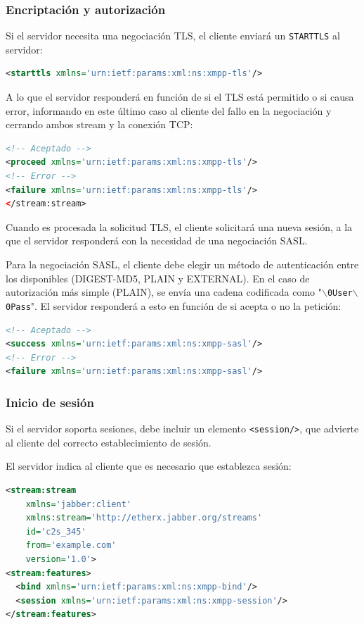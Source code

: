\documentclass[a4paper, 11pt]{article} %
\begin{document}
  \subsubsection{Encriptación y autorización}
    Si el servidor necesita una negociación TLS, el cliente enviará un \texttt{STARTTLS} al servidor:
    \begin{lstlisting}[language=XML]
<starttls xmlns='urn:ietf:params:xml:ns:xmpp-tls'/>    
    \end{lstlisting}
    A lo que el servidor responderá en función de si el TLS está permitido o si causa error, informando en
    este último caso al cliente del fallo en la negociación y cerrando ambos stream y la conexión TCP:
    \begin{lstlisting}[language=XML]
<!-- Aceptado -->
<proceed xmlns='urn:ietf:params:xml:ns:xmpp-tls'/> 
<!-- Error -->
<failure xmlns='urn:ietf:params:xml:ns:xmpp-tls'/> 
</stream:stream>
    \end{lstlisting}
    Cuando es procesada la solicitud TLS, el cliente solicitará una nueva sesión, a la que el servidor
    responderá con la necesidad de una negociación SASL.

    Para la negociación SASL, el cliente debe elegir un método de autenticación entre los disponibles
    (DIGEST-MD5, PLAIN y EXTERNAL). En el caso de autorización más simple (PLAIN), se envía una cadena
    codificada como "\texttt{$\backslash$0User$\backslash$0Pass}". El servidor responderá a esto en 
    función de si acepta o no la petición:
    \begin{lstlisting}[language=XML]
<!-- Aceptado -->
<success xmlns='urn:ietf:params:xml:ns:xmpp-sasl'/>
<!-- Error -->
<failure xmlns='urn:ietf:params:xml:ns:xmpp-sasl'/>
    \end{lstlisting}
    
  \subsubsection{Inicio de sesión}
    Si el servidor soporta sesiones, debe incluir un elemento \texttt{<session/>}, que advierte al cliente del 
    correcto establecimiento de sesión.
    
    El servidor indica al cliente que es necesario que establezca sesión:
\begin{lstlisting}[language=XML]
<stream:stream
    xmlns='jabber:client'
    xmlns:stream='http://etherx.jabber.org/streams'
    id='c2s_345'
    from='example.com'
    version='1.0'>
<stream:features>
  <bind xmlns='urn:ietf:params:xml:ns:xmpp-bind'/>
  <session xmlns='urn:ietf:params:xml:ns:xmpp-session'/>
</stream:features>
\end{lstlisting}
\end{document}
